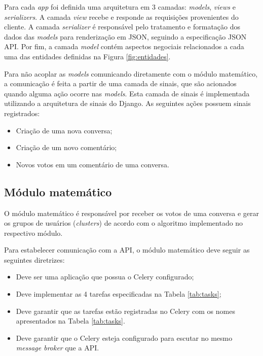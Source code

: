 	Para cada \textit{app} foi definida uma arquitetura
	em 3 camadas: \textit{models}, \textit{views} e \textit{serializers}.
	A camada \textit{view} recebe e responde as requisições provenientes do cliente.
	A camada \textit{serializer} é responsável pelo tratamento e formatação dos dados das \textit{models}
	para renderização em JSON, seguindo a especificação JSON API.
	Por fim, a camada \textit{model} contém aspectos negociais relacionados a cada uma das entidades definidas na 
	Figura \ref{fig:entidades}.
	
	Para não acoplar as \textit{models} comunicando diretamente com o módulo matemático,
	a comunicação é feita a partir de uma camada de sinais, que são acionados quando alguma ação ocorre nas \textit{models}.
	Esta camada de sinais é implementada utilizando a arquitetura de sinais do Django.
	As seguintes ações possuem sinais registrados:
	
	\begin{itemize}
	 \item Criação de uma nova conversa;
	 \item Criação de um novo comentário;
	 \item Novos votos em um comentário de uma conversa.
	\end{itemize}

    
    
    \subsection{Módulo matemático}
	
	O módulo matemático é responsável por receber os votos de uma conversa
	e gerar os grupos de usuários (\textit{clusters}) de acordo com o algoritmo implementado no respectivo módulo.

	Para estabelecer comunicação com a API, o módulo matemático deve seguir as seguintes diretrizes:
	\begin{itemize}
	  \item Deve ser uma aplicação que possua o Celery configurado;
	  \item Deve implementar as 4 tarefas especificadas na Tabela \ref{tab:tasks};
	  \item Deve garantir que as tarefas estão registradas no Celery com os nomes apresentados na Tabela \ref{tab:tasks}.
	  \item Deve garantir que o Celery esteja configurado para escutar no mesmo \textit{message broker} que a API.
	\end{itemize}

